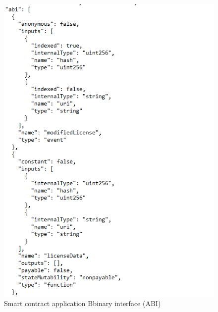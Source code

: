 \begin{center}
	\begin{figure}[htb!]
		
		\begin{minipage}{0.45\linewidth}
			\centering
			\includegraphics[width=1.95\textwidth]{images/chap02_SmartContract_ABI.png}
		\end{minipage}
		\caption[Smart contract application binary interface (ABI)]{Smart contract application Bbinary interface (ABI)}
		
	\end{figure}
	
\end{center}